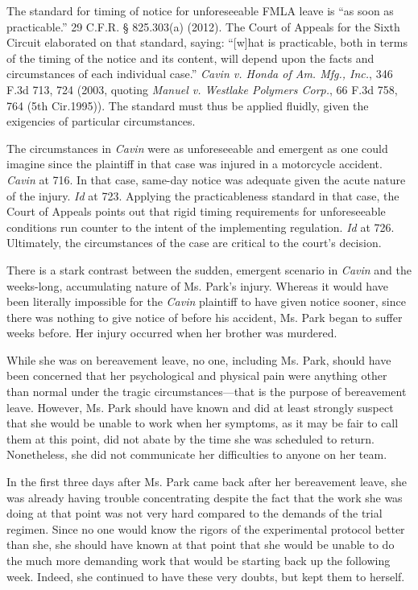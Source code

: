 The standard for timing of notice for unforeseeable FMLA leave is ``as soon as practicable.'' 29 C.F.R. § 825.303(a) (2012). The Court of Appeals for the Sixth Circuit elaborated on that standard, saying: “[w]hat is practicable, both in terms of the timing of the notice and its content, will depend upon the facts and circumstances of each individual case.” \emph{Cavin v. Honda of Am. Mfg., Inc.}, 346 F.3d 713, 724 (2003, quoting \emph{Manuel v. Westlake Polymers Corp.}, 66 F.3d 758, 764 (5th Cir.1995)). The standard must thus be applied fluidly, given the exigencies of particular circumstances.

The circumstances in \emph{Cavin} were as unforeseeable and emergent as one could imagine since the plaintiff in that case was injured in a motorcycle accident. \emph{Cavin} at 716. In that case, same-day notice was adequate given the acute nature of the injury. \emph{Id} at 723. Applying the practicableness standard in that case, the Court of Appeals points out that rigid timing requirements for unforeseeable conditions run counter to the intent of the implementing regulation. \emph{Id} at 726. Ultimately, the circumstances of the case are critical to the court's decision.

There is a stark contrast between the sudden, emergent scenario in \emph{Cavin} and the weeks-long, accumulating nature of Ms. Park's injury. Whereas it would have been literally impossible for the \emph{Cavin} plaintiff to have given notice sooner, since there was nothing to give notice of before his accident, Ms. Park began to suffer weeks before. Her injury occurred when her brother was murdered. 

While she was on bereavement leave, no one, including Ms. Park, should have been concerned that her psychological and physical pain were anything other than normal under the tragic circumstances—that is the purpose of bereavement leave. However, Ms. Park should have known and did at least strongly suspect that she would be unable to work when her symptoms, as it may be fair to call them at this point, did not abate by the time she was scheduled to return. Nonetheless, she did not communicate her difficulties to anyone on her team.

In the first three days after Ms. Park came back after her bereavement leave, she was already having trouble concentrating despite the fact that the work she was doing at that point was not very hard compared to the demands of the trial regimen. Since no one would know the rigors of the experimental protocol better than she, she should have known at that point that she would be unable to do the much more demanding work that would be starting back up the following week. Indeed, she continued to have these very doubts, but kept them to herself.

